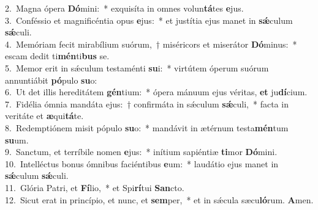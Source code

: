 {2.~}Magna ópera \textbf{Dó}mini:~* exquisíta in omnes volun\textbf{tá}tes \textbf{e}jus.\\
{3.~}Conféssio et magnificéntia opus \textbf{e}jus:~* et justítia ejus manet in \textbf{sǽ}culum \textbf{sǽ}culi.\\
{4.~}Memóriam fecit mirabílium suórum,~† miséricors et miserátor \textbf{Dó}minus:~* escam dedit ti\textbf{mén}ti\textbf{bus} se.\\
{5.~}Memor erit in sǽculum testaménti \textbf{su}i:~* virtútem óperum suórum annuntiábit \textbf{pó}pulo \textbf{su}o:\\
{6.~}Ut det illis hereditátem \textbf{gén}tium:~* ópera mánuum ejus véritas, \textbf{et} ju\textbf{dí}cium.\\
{7.~}Fidélia ómnia mandáta ejus:~† confirmáta in sǽculum \textbf{sǽ}culi,~* facta in veritáte et \textbf{æ}qui\textbf{tá}te.\\
{8.~}Redemptiónem misit pópulo \textbf{su}o:~* mandávit in ætérnum testa\textbf{mén}tum \textbf{su}um.\\
{9.~}Sanctum, et terríbile nomen \textbf{e}jus:~* inítium sapiéntiæ \textbf{ti}mor \textbf{Dó}mini.\\
{10.~}Intelléctus bonus ómnibus faciéntibus \textbf{e}um:~* laudátio ejus manet in \textbf{sǽ}culum \textbf{sǽ}culi.\\
{11.~}Glória Patri, et \textbf{Fí}lio,~* et Spi\textbf{rí}tui \textbf{San}cto.\\
{12.~}Sicut erat in princípio, et nunc, et \textbf{sem}per,~* et in sǽcula sæcu\textbf{ló}rum. \textbf{A}men.\\
